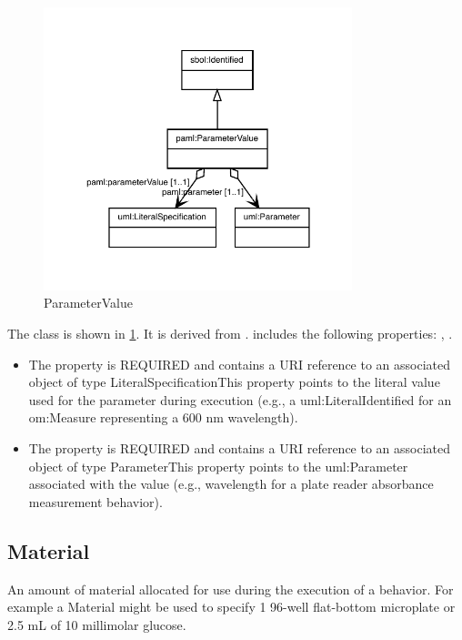 \begin{figure}[h!]%
\centering%
\includegraphics[width=0.8\textwidth]{paml_classes/ParameterValue_abstraction_hierarchy.pdf}%
\caption{ParameterValue}%
\label{fig:ParameterValue}%
\end{figure}

%
The  class is shown in \ref{fig:ParameterValue}. It is derived from .%
 includes the following properties: , . %
\begin{itemize}%
\item%
The  property is REQUIRED and contains a URI reference to an associated object of type LiteralSpecificationThis property points to the literal value used for the parameter during execution (e.g., a
        uml:LiteralIdentified for an om:Measure representing a 600 nm wavelength).%
\item%
The  property is REQUIRED and contains a URI reference to an associated object of type ParameterThis property points to the uml:Parameter associated with the value (e.g., wavelength for a
        plate reader absorbance measurement behavior).%
\end{itemize}%
\subsection{Material}%
\label{sec:paml:Material}%
An amount of material allocated for use during the execution of a behavior.
        For example a Material might be used to specify 1 96-well flat-bottom microplate or 2.5 mL of 10 millimolar glucose.

